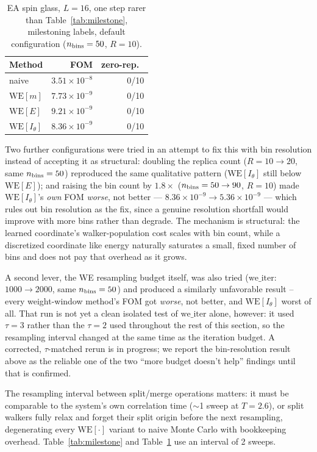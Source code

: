 \documentclass[a4paper,fleqn]{cas-sc}
\begin{document}
\begin{table}[H]
\centering\small
\caption{EA spin glass, $L=16$, one step rarer than Table~\ref{tab:milestone}, milestoning
	labels, default configuration ($n_{\rm bins}=50$, $R=10$).}
\label{tab:milestone2}
\begin{tabular}{lrr}
	\toprule
	Method & FOM & zero-rep.\ \\
	\midrule
	naive & $3.51\times10^{-8}$ & 0/10 \\
	$\mathrm{WE}[m]$ & $7.73\times10^{-9}$ & 0/10 \\
	$\mathrm{WE}[E]$ & $9.21\times10^{-9}$ & 0/10 \\
	$\mathrm{WE}[I_\theta]$ & $8.36\times10^{-9}$ & 0/10 \\
	\bottomrule
\end{tabular}
\end{table}

Two further configurations were tried in an attempt to fix this with bin resolution instead
of accepting it as structural: doubling the replica count ($R=10\to20$, same $n_{\rm
	bins}=50$) reproduced the same qualitative pattern ($\mathrm{WE}[I_\theta]$ still below
$\mathrm{WE}[E]$); and raising the bin count by $1.8\times$ ($n_{\rm bins}=50\to90$, $R=10$)
made $\mathrm{WE}[I_\theta]$'s \emph{own} FOM \emph{worse}, not better ---
$8.36\times10^{-9}\to5.36\times10^{-9}$ --- which rules out bin resolution as the fix, since
a genuine resolution shortfall would improve with more bins rather than degrade. The
mechanism is structural: the learned coordinate's walker-population cost scales with bin
count, while a discretized coordinate like energy naturally saturates a small, fixed
number of bins and does not pay that overhead as it grows.

A second lever, the WE resampling budget itself, was also tried
($\mathrm{we\_iter}$: $1000\to2000$, same $n_{\rm bins}=50$) and produced a similarly
unfavorable result -- every weight-window method's FOM got \emph{worse}, not better, and
$\mathrm{WE}[I_\theta]$ worst of all. That run is not yet a clean isolated test of
$\mathrm{we\_iter}$ alone, however: it used $\tau=3$ rather than the $\tau=2$ used
throughout the rest of this section, so the resampling interval changed at the same time
as the iteration budget. A corrected, $\tau$-matched rerun is in progress; we report the
bin-resolution result above as the reliable one of the two ``more budget doesn't help''
findings until that is confirmed.

The resampling interval between split/merge operations matters: it must be comparable to
the system's own correlation time ($\sim$1 sweep at $T=2.6$), or split walkers fully relax
and forget their split origin before the next resampling, degenerating every
$\mathrm{WE}[\cdot]$ variant to naive Monte Carlo with bookkeeping overhead. Table~\ref{tab:milestone}
and Table~\ref{tab:milestone2} use an interval of 2 sweeps.
\end{document}
